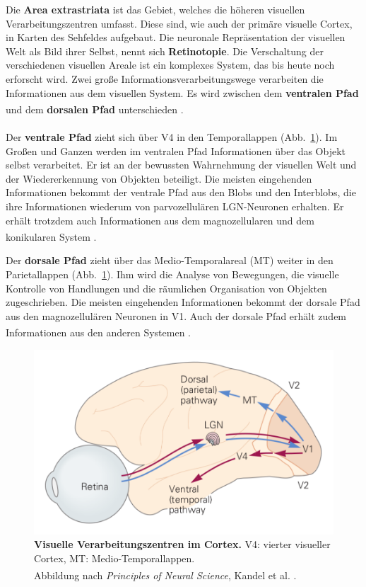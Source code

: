 Die \textbf{Area extrastriata} ist das Gebiet, welches die höheren visuellen Verarbeitungszentren umfasst. Diese sind, wie auch der primäre visuelle Cortex, in Karten des Sehfeldes aufgebaut. Die neuronale Repräsentation der visuellen Welt als Bild ihrer Selbst, nennt sich \textbf{Retinotopie}.  Die Verschaltung der verschiedenen visuellen Areale ist ein komplexes System, das bis heute noch erforscht wird. Zwei große Informationsverarbeitungswege verarbeiten die Informationen aus dem visuellen System. Es wird zwischen dem \textbf{ventralen Pfad} und dem \textbf{dorsalen Pfad} unterschieden \textsuperscript{\cite[Kap.~25]{kandel2013principles}}.
\\
\\ \noindent Der \textbf{ventrale Pfad} zieht sich über V4 in den Temporallappen (Abb.~\ref{fig:visual_pathway_cortex}). Im Großen und Ganzen werden im ventralen Pfad Informationen über das Objekt selbst verarbeitet. Er ist an der bewussten Wahrnehmung der visuellen Welt und der Wiedererkennung von Objekten beteiligt. Die meisten eingehenden Informationen bekommt der ventrale Pfad aus den Blobs und den Interblobs, die ihre Informationen wiederum von parvozellulären LGN-Neuronen erhalten. Er erhält trotzdem auch Informationen aus dem magnozellularen und dem konikularen System \textsuperscript{\cite[Kap.~10]{neurowissenschaften_baer}}.


Der \textbf{dorsale Pfad} zieht über das Medio-Temporalareal (MT) weiter in den  Parietallappen (Abb.~\ref{fig:visual_pathway_cortex}). Ihm wird die Analyse von Bewegungen, die visuelle Kontrolle von Handlungen  
und die räumlichen Organisation von Objekten zugeschrieben. Die meisten eingehenden Informationen bekommt der dorsale Pfad aus den magnozellulären Neuronen in V1. Auch der dorsale Pfad erhält zudem Informationen aus den anderen Systemen \textsuperscript{\cite[Kap.~10]{neurowissenschaften_baer}}.

\begin{figure}[H]
    \centering
    \includegraphics{pictures/visual/visual_Cortex.pdf}
    \caption[Visuelle Verarbeitungszentren im Cortex]{\textbf{Visuelle Verarbeitungszentren im Cortex.} V4: vierter visueller Cortex, MT: Medio-Temporallappen.\\
    Abbildung nach \textit{Principles of Neural Science}, Kandel et al. \textsuperscript{\cite[Kap.~27]{kandel2013principles}}.}
    \label{fig:visual_pathway_cortex}
\end{figure}



